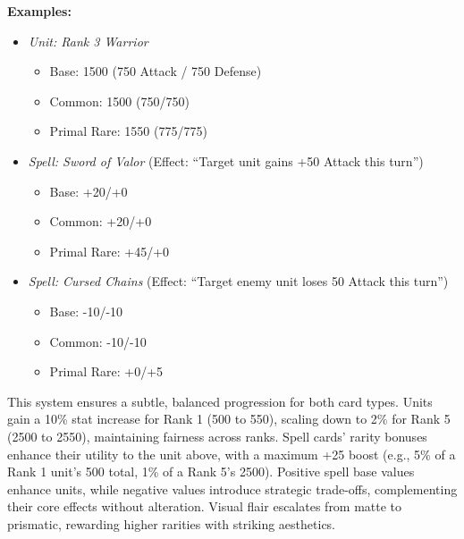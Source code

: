 \textbf{Examples:}
\begin{itemize}
    \item \textit{Unit: Rank 3 Warrior}
    \begin{itemize}
        \item Base: 1500 (750 Attack / 750 Defense)
        \item Common: 1500 (750/750)
        \item Primal Rare: 1550 (775/775)
    \end{itemize}
    \item \textit{Spell: Sword of Valor} (Effect: ``Target unit gains +50 Attack this turn'')
    \begin{itemize}
        \item Base: +20/+0
        \item Common: +20/+0
        \item Primal Rare: +45/+0
    \end{itemize}
    \item \textit{Spell: Cursed Chains} (Effect: ``Target enemy unit loses 50 Attack this turn'')
    \begin{itemize}
        \item Base: -10/-10
        \item Common: -10/-10
        \item Primal Rare: +0/+5
    \end{itemize}
\end{itemize}

This system ensures a subtle, balanced progression for both card types. Units gain a 10\% stat increase for Rank 1 (500 to 550), scaling down to 2\% for Rank 5 (2500 to 2550), maintaining fairness across ranks. Spell cards' rarity bonuses enhance their utility to the unit above, with a maximum +25 boost (e.g., 5\% of a Rank 1 unit's 500 total, 1\% of a Rank 5's 2500). Positive spell base values enhance units, while negative values introduce strategic trade-offs, complementing their core effects without alteration. Visual flair escalates from matte to prismatic, rewarding higher rarities with striking aesthetics.